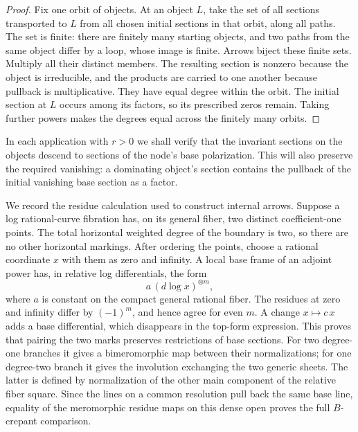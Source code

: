 \documentclass[11pt,letterpaper]{article}
\theoremstyle{definition}
\theoremstyle{remark}
\begin{document}
\begin{proof}
Fix one orbit of objects.  At an object $L$, take the set of all
sections transported to $L$ from all chosen initial sections in that
orbit, along all paths.  The set is finite: there are finitely many
starting objects, and two paths from the same object differ by a
loop, whose image is finite.  Arrows biject these finite sets.
Multiply all their distinct members.  The resulting section is
nonzero because the object is irreducible, and the products are
carried to one another because pullback is multiplicative.  They
have equal degree within the orbit.  The initial section at $L$
occurs among its factors, so its prescribed zeros remain.  Taking
further powers makes the degrees equal across the finitely many
orbits.
\end{proof}

In each application with $r>0$ we shall verify that the invariant
sections on the objects descend to sections of the node's base
polarization.  This will also preserve the required vanishing: a
dominating object's section contains the pullback of the initial
vanishing base section as a factor.

We record the residue calculation used to construct internal arrows.
Suppose a log rational-curve fibration has, on its general fiber,
two distinct coefficient-one points.  The total horizontal weighted
degree of the boundary is two, so there are no other horizontal
markings.  After ordering the points, choose a rational coordinate
$x$ with them as zero and infinity.  A local base frame of an
adjoint power has, in relative log differentials, the form
\begin{equation}
 \label{floor:dlog-residues}
  a\,(d\log x)^{\otimes m},
\end{equation}
where $a$ is constant on the compact general rational fiber.  The
residues at zero and infinity differ by $(-1)^m$, and hence agree
for even $m$.  A change $x\mapsto c\,x$ adds a base differential,
which disappears in the top-form expression.  This proves that
pairing the two marks preserves restrictions of base sections.
For two degree-one branches it gives a bimeromorphic map between
their normalizations; for one degree-two branch it gives the
involution exchanging the two generic sheets.  The latter is
defined by normalization of the other main component of the
relative fiber square.  Since the lines on a common resolution
pull back the same base line, equality of the meromorphic residue
maps on this dense open proves the full $B$-crepant comparison.
\end{document}
